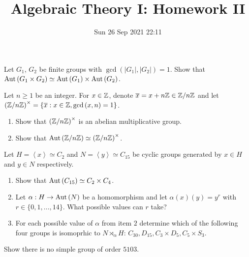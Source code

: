 \documentclass[a4paper]{article}
\title{Algebraic Theory I: Homework II}
\date{Sun 26 Sep 2021 22:11}
\begin{document}
\maketitle
\begin{problem}[1]
	Let \(G_1\), \(G_2\) be finite groups with \(\gcd\left( \left| G_1 \right| , \left| G_2 \right|  \right) = 1\). Show that \(\operatorname{Aut}\left( G_1 \times G_2 \right)  \simeq \operatorname{Aut}\left( G_1 \right) \times \operatorname{Aut}\left( G_2 \right) \).
\end{problem}
\begin{solution}
\end{solution}
\newpage
\begin{problem}[2]
	Let \(n \ge 1 \) be an integer. For \( x \in \mathbb{Z}\), denote \(\overline{x} = x + n\mathbb{Z} \in \mathbb{Z} / n\mathbb{Z}\) and let \(\left( \mathbb{Z} / n\mathbb{Z} \right)^{\times} = \{\overline{x} : x \in \mathbb{Z}, \gcd\left( x, n \right) = 1\}  \).
	\begin{enumerate}
		\item Show that \(\left( \mathbb{Z} / n\mathbb{Z} \right)^{\times} \) is an abelian multiplicative group.
		\item Show that \(\operatorname{Aut}\left( \mathbb{Z} / n\mathbb{Z} \right) \simeq \left( \mathbb{Z} / n\mathbb{Z} \right)^{\times} \).
	\end{enumerate}
\end{problem}
\begin{solution}
\end{solution}
\newpage
\begin{problem}[3]
	Let \(H = \left<x \right>  \simeq C_2\) and \(N = \left<y \right> \simeq C_{15}\) be cyclic groups generated by \(x \in H\) and \(y \in N\) respectively.
	\begin{enumerate}
		\item Show that \(\operatorname{Aut}\left( C_{15} \right) \simeq C_2 \times C_4 \).
		\item Let \(\alpha: H \to \operatorname{Aut} \left( N \right) \) be a homomorphism and let \(\alpha\left( x \right) \left( y \right)  = y^{r}\) with \(r \in \{ 0, 1, \ldots, 14\} \). What possible values can \(r\) take?
			\item For each possible value of \(\alpha\) from item \(2\) determine which of the following four groups is isomoprhic to \(N \rtimes_{\alpha} H\): \(C_{30}, D_{15}, C_3 \times D_5, C_5 \times S_3\).
	\end{enumerate}
\end{problem}
\begin{solution}
\end{solution}
\newpage
\begin{problem}[4]
	Show there is no simple group of order \(5103\).
\end{problem}
\end{document}
